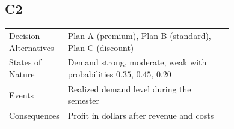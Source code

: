 \begin{ExamProblems}
		\subsection*{C2}
		\begin{center}
			\begin{tabular}{l p{0.74\linewidth}}
				\toprule
				Decision Alternatives & Plan A (premium), Plan B (standard), Plan C (discount) \\
				States of Nature & Demand strong, moderate, weak with probabilities $0.35$, $0.45$, $0.20$ \\
				Events & Realized demand level during the semester \\
				Consequences & Profit in dollars after revenue and costs \\
				\bottomrule
			\end{tabular}
		\end{center}


\end{ExamProblems}
